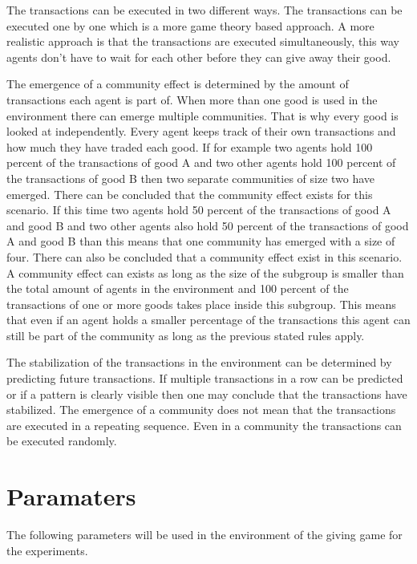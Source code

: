 \documentclass[twoside,openright]{uva-bachelor-thesis}
\begin{document}
The transactions can be executed in two different ways. The transactions can be executed one by one which is a more game theory based approach. A more realistic approach is that the transactions are executed simultaneously, this way agents don’t have to wait for each other before they can give away their good. 

The emergence of a community effect is determined by the amount of transactions each agent is part of. When more than one good is used in the environment there can emerge multiple communities. That is why every good is looked at independently. Every agent keeps track of their own transactions and how much they have traded each good. If for example two agents hold 100 percent of the transactions of good A and two other agents hold 100 percent of the transactions of good B then two separate communities of size two have emerged. There can be concluded that the community effect exists for this scenario. If this time two agents hold 50 percent of the transactions of good A and good B and two other agents also hold 50 percent of the transactions of good A and good B than this means that one community has emerged with a size of four. There can also be concluded that a community effect exist in this scenario. A community effect can exists as long as the size of the subgroup is smaller than the total amount of agents in the environment and 100 percent of the transactions of one or more goods takes place inside this subgroup. This means that even if an agent holds a smaller percentage of the transactions this agent can still be part of the community as long as the previous stated rules apply.

The stabilization of the transactions in the environment can be determined by predicting future transactions. If multiple transactions in a row can be predicted or if a pattern is clearly visible then one may conclude that the transactions have stabilized. The emergence of a community does not mean that the transactions are executed in a repeating sequence. Even in a community the transactions can be executed randomly.


\section{Paramaters}
The following parameters will be used in the environment of the giving game for the experiments.
\end{document}

